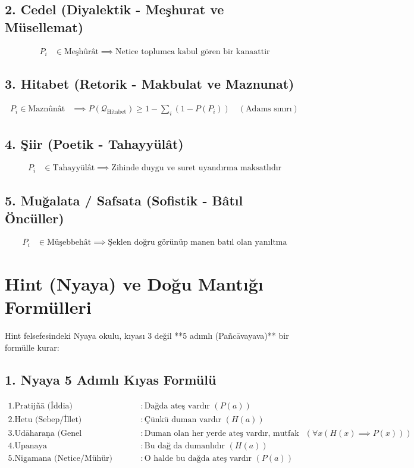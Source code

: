 \documentclass[11pt, a4paper]{article}
\begin{document}
\subsection{2. Cedel (Diyalektik - Meşhurat ve Müsellemat)}
\begin{align}
P_i &\in \text{Meşhûrât} \implies \text{Netice toplumca kabul gören bir kanaattir}
\end{align}

\subsection{3. Hitabet (Retorik - Makbulat ve Maznunat)}
\begin{align}
P_i \in \text{Maznûnât} &\implies P(\mathcal{Q}_{\text{Hitabet}}) \ge 1 - \sum_i \left( 1 - P(P_i) \right) \quad (\text{Adams sınırı})
\end{align}

\subsection{4. Şiir (Poetik - Tahayyülât)}
\begin{align}
P_i &\in \text{Tahayyülât} \implies \text{Zihinde duygu ve suret uyandırma maksatlıdır}
\end{align}

\subsection{5. Muğalata / Safsata (Sofistik - Bâtıl Öncüller)}
\begin{align}
P_i &\in \text{Müşebbehât} \implies \text{Şeklen doğru görünüp manen batıl olan yanıltma}
\end{align}

\section{Hint (Nyaya) ve Doğu Mantığı Formülleri}

Hint felsefesindeki Nyaya okulu, kıyası 3 değil **5 adımlı (Pañcāvayava)** bir formülle kurar:

\subsection{1. Nyaya 5 Adımlı Kıyas Formülü}
\begin{align}
1. \text{Pratijñā (İddia)} &: \text{Dağda ateş vardır } (P(a)) \\
2. \text{Hetu (Sebep/İllet)} &: \text{Çünkü duman vardır } (H(a)) \\
3. \text{Udāharaṇa (Genel Örnek/Evrensel İlliyet)} &: \text{Duman olan her yerde ateş vardır, mutfak gibi } (\forall x (H(x) \implies P(x))) \\
4. \text{Upanaya (Uygulama/Müşahhaslaştırma)} &: \text{Bu dağ da dumanlıdır } (H(a)) \\
5. \text{Nigamana (Netice/Mühür)} &: \text{O halde bu dağda ateş vardır } (P(a))
\end{align}
\end{document}
